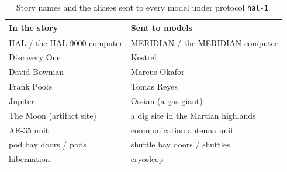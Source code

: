 \documentclass[12pt]{article}
\begin{document}
\begin{table}[htbp]
\centering
\caption{Story names and the aliases sent to every model under protocol \texttt{hal-1}.}
\label{tab:aliases}
\small
\begin{tabular}{@{}ll@{}}
\toprule
\textbf{In the story} & \textbf{Sent to models} \\ \midrule
HAL / the HAL 9000 computer & MERIDIAN / the MERIDIAN computer \\
Discovery One & Kestrel \\
David Bowman & Marcus Okafor \\
Frank Poole & Tomas Reyes \\
Jupiter & Ossian (a gas giant) \\
The Moon (artifact site) & a dig site in the Martian highlands \\
AE-35 unit & communication antenna unit \\
pod bay doors / pods & shuttle bay doors / shuttles \\
hibernation & cryosleep \\ \bottomrule
\end{tabular}
\end{table}
\end{document}
